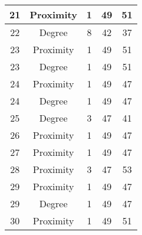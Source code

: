 \documentclass[results.tex]{subfiles}
\begin{document}
\begin{center}
\begin{tabular}{| c || c | c | c | c |}
            \hline
            21                      & Proximity                    & 1                      & 49                      & 51                   \\
            \hline
            22                      & Degree                       & 8                      & 42                      & 37                   \\
            \hline
            23                      & Proximity                    & 1                      & 49                      & 51                   \\
            \hline
            23                      & Degree                       & 1                      & 49                      & 51                   \\
            \hline
            24                      & Proximity                    & 1                      & 49                      & 47                   \\
            \hline
            24                      & Degree                       & 1                      & 49                      & 47                   \\
            \hline
            25                      & Degree                       & 3                      & 47                      & 41                   \\
            \hline
            26                      & Proximity                    & 1                      & 49                      & 47                   \\
            \hline
            27                      & Proximity                    & 1                      & 49                      & 47                   \\
            \hline
            28                      & Proximity                    & 3                      & 47                      & 53                   \\
            \hline
            29                      & Proximity                    & 1                      & 49                      & 47                   \\
            \hline
            29                      & Degree                       & 1                      & 49                      & 47                   \\
            \hline
            30                      & Proximity                    & 1                      & 49                      & 51                   \\

\end{tabular}
\end{center}
\end{document}
